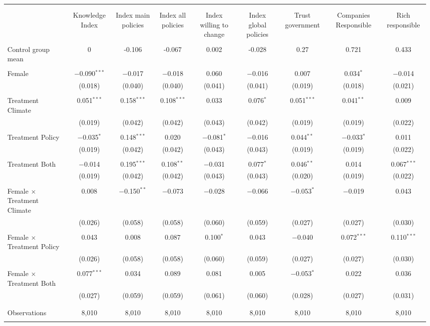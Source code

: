 
\begin{tabular}{@{\extracolsep{5pt}}lcccccccc} 
\\[-1.8ex]\hline 
\hline \\[-1.8ex] 
\\[-1.8ex] & Knowledge Index & Index main policies & Index all policies & Index willing to change & Index global policies & Trust government & Companies Responsible & Rich responsible \\ 
\hline \\[-1.8ex] 
 Control group mean & 0 & -0.106 & -0.067 & 0.002 & -0.028 & 0.27 & 0.721 & 0.433  \\ \hline \\[-1.8ex] Female & $-$0.090$^{***}$ & $-$0.017 & $-$0.018 & 0.060 & $-$0.016 & 0.007 & 0.034$^{*}$ & $-$0.014 \\ 
  & (0.018) & (0.040) & (0.040) & (0.041) & (0.041) & (0.019) & (0.018) & (0.021) \\ 
  & & & & & & & & \\ 
 Treatment Climate & 0.051$^{***}$ & 0.158$^{***}$ & 0.108$^{***}$ & 0.033 & 0.076$^{*}$ & 0.051$^{***}$ & 0.041$^{**}$ & 0.009 \\ 
  & (0.019) & (0.042) & (0.042) & (0.043) & (0.042) & (0.019) & (0.019) & (0.022) \\ 
  & & & & & & & & \\ 
 Treatment Policy & $-$0.035$^{*}$ & 0.148$^{***}$ & 0.020 & $-$0.081$^{*}$ & $-$0.016 & 0.044$^{**}$ & $-$0.033$^{*}$ & 0.011 \\ 
  & (0.019) & (0.042) & (0.042) & (0.043) & (0.043) & (0.019) & (0.019) & (0.022) \\ 
  & & & & & & & & \\ 
 Treatment Both & $-$0.014 & 0.195$^{***}$ & 0.108$^{**}$ & $-$0.031 & 0.077$^{*}$ & 0.046$^{**}$ & 0.014 & 0.067$^{***}$ \\ 
  & (0.019) & (0.042) & (0.042) & (0.043) & (0.043) & (0.020) & (0.019) & (0.022) \\ 
  & & & & & & & & \\ 
 Female $\times$ Treatment Climate & 0.008 & $-$0.150$^{**}$ & $-$0.073 & $-$0.028 & $-$0.066 & $-$0.053$^{*}$ & $-$0.019 & 0.043 \\ 
  & (0.026) & (0.058) & (0.058) & (0.060) & (0.059) & (0.027) & (0.027) & (0.030) \\ 
  & & & & & & & & \\ 
 Female $\times$ Treatment Policy & 0.043 & 0.008 & 0.087 & 0.100$^{*}$ & 0.043 & $-$0.040 & 0.072$^{***}$ & 0.110$^{***}$ \\ 
  & (0.026) & (0.058) & (0.058) & (0.060) & (0.059) & (0.027) & (0.027) & (0.030) \\ 
  & & & & & & & & \\ 
 Female $\times$ Treatment Both & 0.077$^{***}$ & 0.034 & 0.089 & 0.081 & 0.005 & $-$0.053$^{*}$ & 0.022 & 0.036 \\ 
  & (0.027) & (0.059) & (0.059) & (0.061) & (0.060) & (0.028) & (0.027) & (0.031) \\ 
  & & & & & & & & \\ 
\hline \\[-1.8ex] 

Observations & 8,010 & 8,010 & 8,010 & 8,010 & 8,010 & 8,010 & 8,010 & 8,010 \\ 
\hline 
\hline \\[-1.8ex] 
\end{tabular} 